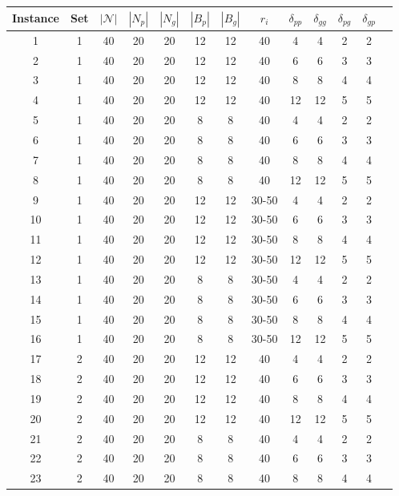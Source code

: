 \documentclass[11pt]{article}
\begin{document}
\begin{table}[t!]
    \footnotesize
    \centering
\begin{tabular}{@{}ccccccccccccc@{}}
\toprule
Instance & Set & $|\mathcal{N}|$ & $|N_p|$ & $|N_g|$ & $|B_p|$ & $|B_g|$ & $r_i$ & $\delta_{pp}$ & $\delta_{gg}$ & $\delta_{pg}$ & $\delta_{gp}$ \\ \midrule \hline
1 & 1 & 40 & 20 & 20 & 12 & 12 & 40 & 4 & 4 & 2 & 2 \\
2 & 1 & 40 & 20 & 20 & 12 & 12 & 40 & 6 & 6 & 3 & 3 \\
3 & 1 & 40 & 20 & 20 & 12 & 12 & 40 & 8 & 8 & 4 & 4 \\
4 & 1 & 40 & 20 & 20 & 12 & 12 & 40 & 12 & 12 & 5 & 5 \\\hline
5 & 1 & 40 & 20 & 20 & 8 & 8 & 40 & 4 & 4 & 2 & 2 \\
6 & 1 & 40 & 20 & 20 & 8 & 8 & 40 & 6 & 6 & 3 & 3 \\
7 & 1 & 40 & 20 & 20 & 8 & 8 & 40 & 8 & 8 & 4 & 4 \\
8 & 1 & 40 & 20 & 20 & 8 & 8 & 40 & 12 & 12 & 5 & 5 \\\hline
9 & 1 & 40 & 20 & 20 & 12 & 12 & 30-50 & 4 & 4 & 2 & 2 \\
10 & 1 & 40 & 20 & 20 & 12 & 12 & 30-50 & 6 & 6 & 3 & 3 \\
11 & 1 & 40 & 20 & 20 & 12 & 12 & 30-50 & 8 & 8 & 4 & 4 \\
12 & 1 & 40 & 20 & 20 & 12 & 12 & 30-50 & 12 & 12 & 5 & 5 \\\hline
13 & 1 & 40 & 20 & 20 & 8 & 8 & 30-50 & 4 & 4 & 2 & 2 \\
14 & 1 & 40 & 20 & 20 & 8 & 8 & 30-50 & 6 & 6 & 3 & 3 \\
15 & 1 & 40 & 20 & 20 & 8 & 8 & 30-50 & 8 & 8 & 4 & 4 \\
16 & 1 & 40 & 20 & 20 & 8 & 8 & 30-50 & 12 & 12 & 5 & 5 \\\hline\hline
17 & 2 & 40 & 20 & 20 & 12 & 12 & 40 & 4 & 4 & 2 & 2 \\
18 & 2 & 40 & 20 & 20 & 12 & 12 & 40 & 6 & 6 & 3 & 3 \\
19 & 2 & 40 & 20 & 20 & 12 & 12 & 40 & 8 & 8 & 4 & 4 \\
20 & 2 & 40 & 20 & 20 & 12 & 12 & 40 & 12 & 12 & 5 & 5 \\\hline
21 & 2 & 40 & 20 & 20 & 8 & 8 & 40 & 4 & 4 & 2 & 2 \\
22 & 2 & 40 & 20 & 20 & 8 & 8 & 40 & 6 & 6 & 3 & 3 \\
23 & 2 & 40 & 20 & 20 & 8 & 8 & 40 & 8 & 8 & 4 & 4 \\

\end{tabular}
\end{table}
\end{document}
